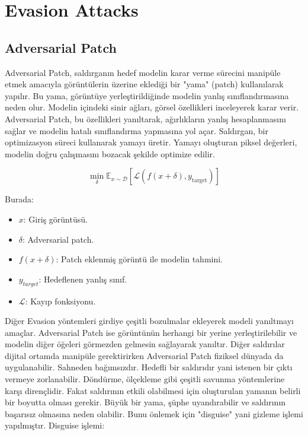 \section{Evasion Attacks}

\subsection{Adversarial Patch}

Adversarial Patch, saldırganın hedef modelin karar verme sürecini manipüle etmek amacıyla görüntülerin üzerine eklediği bir "yama" (patch) kullanılarak yapılır. Bu yama, görüntüye yerleştirildiğinde modelin yanlış sınıflandırmasına neden olur. Modelin içindeki sinir ağları, görsel özellikleri inceleyerek karar verir. Adversarial Patch, bu özellikleri yanıltarak, ağırlıkların yanlış hesaplanmasını sağlar ve modelin hatalı sınıflandırma yapmasına yol açar. Saldırgan, bir optimizasyon süreci kullanarak yamayı üretir. Yamayı oluşturan piksel değerleri, modelin doğru çalışmasını bozacak şekilde optimize edilir.

\[ \min_{\delta} \mathbb{E}_{x \sim \mathcal{D}} \left[ \mathcal{L}(f(x + \delta), y_{\text{target}}) \right] \]

Burada:

\begin{itemize}
    \item $x$: Giriş görüntüsü.
    \item $\delta$: Adversarial patch.
    \item $f(x + \delta)$: Patch eklenmiş görüntü ile modelin tahmini.
    \item $y_{target}$: Hedeflenen yanlış sınıf.
    \item $\mathcal{L}$: Kayıp fonksiyonu.
\end{itemize}

Diğer Evasion yöntemleri girdiye çeşitli bozulmalar ekleyerek modeli yanıltmayı amaçlar. Adversarial Patch ise görüntünün herhangi bir yerine yerleştirilebilir ve modelin diğer öğeleri görmezden gelmesin sağlayarak yanıltır. Diğer saldırılar dijital ortamda manipüle gerektirirken Adversarial Patch fiziksel dünyada da uygulanabilir. Sahneden bağımsızdır. Hedefli bir saldırıdır yani istenen bir çıktı vermeye zorlanabilir. Döndürme, ölçekleme gibi çeşitli savunma yöntemlerine karşı dirençlidir. Fakat saldırının etkili olabilmesi için oluşturulan yamanın belirli bir boyutta olması gerekir. Büyük bir yama, şüphe uyandırabilir ve saldırının başarısız olmasına neden olabilir. Bunu önlemek için "disguise" yani gizleme işlemi yapılmıştır. Disguise işlemi:


